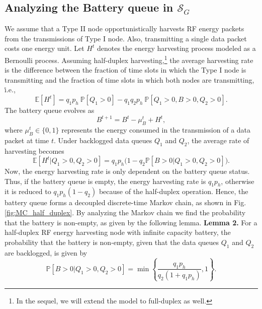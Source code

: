 \documentclass[draftcls,12pt,onecolumn]{IEEEtran}
\begin{document}
\subsection{Analyzing the Battery queue in $\mathcal{S}_G$}
We assume that a Type II node opportunistically harvests RF energy packets from the transmissions of Type I node. Also, transmitting a single data packet costs one energy unit. Let $H^t$ denotes the energy harvesting process modeled as a Bernoulli process. Assuming half-duplex harvesting,\footnote{In the sequel, we will extend the model to full-duplex as well.} the average harvesting rate is the difference between the fraction of time slots in which the Type I node is transmitting and the fraction of time slots in which both nodes are transmitting, \.i.e.,
\vspace{-0.2in}
 \begin{equation}\label{eqn: harvt rate}
 \mathbb{E}[H^{t}] = q_1 p_{h} \ \mathbb{P}[Q_1 \! > \! 0]-q_1 q_2 p_{h} \ \mathbb{P}[Q_1 \! > \! 0, B \! > \!0, Q_2 \! > \! 0]. 
 \end{equation}
The battery queue evolves as \cite{jeon2015stability}
\vspace{-0.2in}
\begin{equation}
B^{t+1}=B^{t}-\mu_B^{t} + H^{t},
 \end{equation}
where $\mu_B^{t} \in \lbrace 0,1 \rbrace$ represents the energy consumed in the transmission of a data packet at time $t$.
Under backlogged data queues $Q_1$ and $Q_2$, the average rate of harvesting becomes 
\begin{equation}
 \mathbb{E}[H^{t} | Q_1 \! > \! 0, Q_2 \! > \!0] = q_1 p_{h} \big ( 1-q_2 \mathbb{P}[B \! > \!0| Q_1 \! > \! 0, Q_2 \! > \!0] \big ). 
 \end{equation}
\indent Now, the energy harvesting rate is only dependent on the battery queue status. Thus, if the battery queue is empty, the energy harvesting rate is $q_1 p_h$, otherwise it is reduced to $q_1 p_h (1-q_2)$ because of the half-duplex operation. Hence, the battery queue forms a decoupled discrete-time Markov chain, as shown in Fig. \ref{fig:MC_half_duplex}. By analyzing the Markov chain we find the probability that the battery is non-empty, as given by the following lemma. \newline
\indent \textbf{Lemma 2.} For a half-duplex RF energy harvesting node with infinite capacity battery, the probability that the battery is non-empty, given that the data queues $Q_1$ and $Q_2$ are backlogged, is given by 
\begin{equation}
\mathbb{P}[B>0| Q_1>0, Q_2 >0]= \min \left\lbrace \frac{q_1 p_{h}}{q_2 (1+ q_1 p_{h})}, 1\right\rbrace .
\end{equation}
\end{document}
